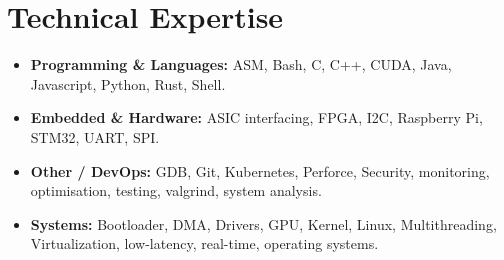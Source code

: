 \documentclass[9pt,a4paper]{article}
\begin{document}
\section*{Technical Expertise}
\begin{tcolorbox}[mybox]
\begin{itemize}
\item \textbf{Programming \& Languages:} ASM, Bash, C, C++, CUDA, Java, Javascript, Python, Rust, Shell.

\item \textbf{Embedded \& Hardware:} ASIC interfacing, FPGA, I2C, Raspberry Pi, STM32, UART, SPI.

\item \textbf{Other / DevOps:} GDB, Git, Kubernetes, Perforce, Security, monitoring, optimisation, testing, valgrind, system analysis.

\item \textbf{Systems:} Bootloader, DMA, Drivers, GPU, Kernel, Linux, Multithreading, Virtualization, low-latency, real-time, operating systems.
\end{itemize}
\end{tcolorbox}
\end{document}
